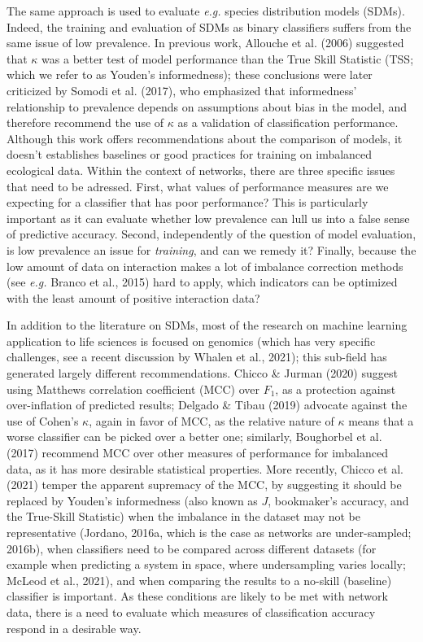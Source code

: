 \documentclass[11pt]{article}
\begin{document}
The same approach is used to evaluate \emph{e.g.} species distribution
models (SDMs). Indeed, the training and evaluation of SDMs as binary
classifiers suffers from the same issue of low prevalence. In previous
work, Allouche et al. (2006) suggested that \(\kappa\) was a better test
of model performance than the True Skill Statistic (TSS; which we refer
to as Youden's informedness); these conclusions were later criticized by
Somodi et al. (2017), who emphasized that informedness' relationship to
prevalence depends on assumptions about bias in the model, and therefore
recommend the use of \(\kappa\) as a validation of classification
performance. Although this work offers recommendations about the
comparison of models, it doesn't establishes baselines or good practices
for training on imbalanced ecological data. Within the context of
networks, there are three specific issues that need to be adressed.
First, what values of performance measures are we expecting for a
classifier that has poor performance? This is particularly important as
it can evaluate whether low prevalence can lull us into a false sense of
predictive accuracy. Second, independently of the question of model
evaluation, is low prevalence an issue for \emph{training}, and can we
remedy it? Finally, because the low amount of data on interaction makes
a lot of imbalance correction methods (see \emph{e.g.} Branco et al.,
2015) hard to apply, which indicators can be optimized with the least
amount of positive interaction data?

In addition to the literature on SDMs, most of the research on machine
learning application to life sciences is focused on genomics (which has
very specific challenges, see a recent discussion by Whalen et al.,
2021); this sub-field has generated largely different recommendations.
Chicco \& Jurman (2020) suggest using Matthews correlation coefficient
(MCC) over \(F_1\), as a protection against over-inflation of predicted
results; Delgado \& Tibau (2019) advocate against the use of Cohen's
\(\kappa\), again in favor of MCC, as the relative nature of \(\kappa\)
means that a worse classifier can be picked over a better one;
similarly, Boughorbel et al. (2017) recommend MCC over other measures of
performance for imbalanced data, as it has more desirable statistical
properties. More recently, Chicco et al. (2021) temper the apparent
supremacy of the MCC, by suggesting it should be replaced by Youden's
informedness (also known as \(J\), bookmaker's accuracy, and the
True-Skill Statistic) when the imbalance in the dataset may not be
representative (Jordano, 2016a, which is the case as networks are
under-sampled; 2016b), when classifiers need to be compared across
different datasets (for example when predicting a system in space, where
undersampling varies locally; McLeod et al., 2021), and when comparing
the results to a no-skill (baseline) classifier is important. As these
conditions are likely to be met with network data, there is a need to
evaluate which measures of classification accuracy respond in a
desirable way.
\end{document}
